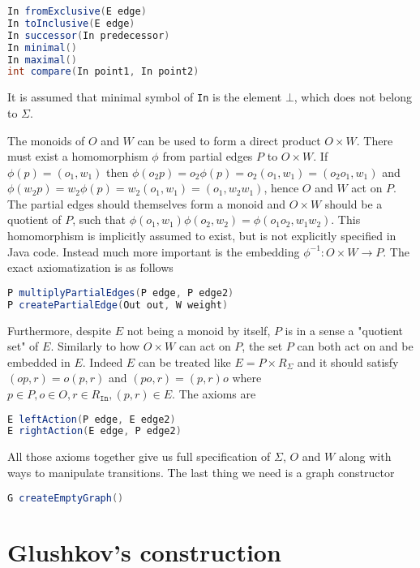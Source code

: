 \documentclass[12pt]{article}
\begin{document}
 \begin{lstlisting}[language=java]
In fromExclusive(E edge)
In toInclusive(E edge)
In successor(In predecessor)
In minimal() 
In maximal()
int compare(In point1, In point2)
 \end{lstlisting}
 It is assumed that minimal symbol of \texttt{In} is the element $\bot$,  which does not belong to $\Sigma$.
 
 The monoids of $O$ and $W$ can be used to form a direct product $O\times W$. There must exist a homomorphism $\phi$ from   partial edges $P$ to $O\times W$. If $\phi(p)=(o_1,w_1)$ then $\phi(o_2 p)=o_2\phi(p)=o_2(o_1,w_1)=(o_2o_1,w_1)$  and $\phi(w_2 p)=w_2\phi(p)=w_2(o_1,w_1)=(o_1,w_2w_1)$, hence $O$ and $W$ act on $P$. The partial edges should themselves form a monoid and $O\times W$ should be a quotient of $P$, such that $\phi(o_1,w_1)\phi(o_2,w_2)=\phi(o_1o_2,w_1w_2)$. This homomorphism is implicitly assumed to exist, but is not explicitly specified in Java code. Instead much more important is the embedding $\phi^{-1}:O\times W\rightarrow P$. The exact axiomatization is as follows
 
 \begin{lstlisting}[language=java]
P multiplyPartialEdges(P edge, P edge2)
P createPartialEdge(Out out, W weight)
 \end{lstlisting}
 
Furthermore, despite $E$ not being a monoid by itself, $P$ is in a sense a "quotient set" of $E$. Similarly to how $O\times W$ can act on $P$, the set $P$ can both act on and be embedded in $E$. Indeed $E$ can be treated like $E=P\times R_\Sigma$ and it should satisfy $(op,r)=o(p,r)$ and $(po,r)=(p,r)o$ where $p\in P, o\in O,r\in R_\texttt{In}, (p,r)\in E$.  The axioms are
 
 \begin{lstlisting}[language=java]
E leftAction(P edge, E edge2)
E rightAction(E edge, P edge2)
 \end{lstlisting}
 
 All those axioms together give us full specification of $\Sigma$, $O$ and $W$ along with ways to manipulate transitions.  The last thing we need is a graph constructor 
 \begin{lstlisting}[language=java]
G createEmptyGraph()
 \end{lstlisting}
 
 
\section{Glushkov's construction}
  
\end{document}
